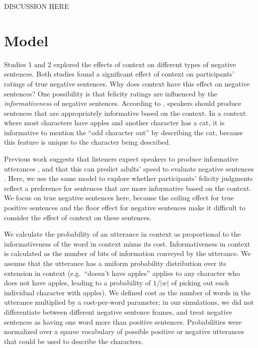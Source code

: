 \documentclass[10pt,letterpaper]{article}
\begin{document}
DISCUSSION HERE


\section{Model}

Studies 1 and 2 explored the effects of context on different types of negative sentences.  Both studies found a significant effect of context on participants' ratings of true negative sentences.  Why does context have this effect on negative sentences?  One possibility is that felicity ratings are influenced by the \emph{informativeness} of negative sentences.  According to , speakers should produce sentences that are appropriately informative based on the context.  In a context where most characters have apples and another character has a cat, it is informative to mention the ``odd character out'' by describing the cat, because this feature is unique to the character being described.

Previous work suggests that listeners expect speakers to produce informative utterances \cite{frank2012}, and that this can predict adults' speed to evaluate negative sentences \cite{nordmeyer2013}.  Here, we use the same model to explore whether participants' felicity judgments reflect a preference for sentences that are more informative based on the context.  We focus on true negative sentences here, because the ceiling effect for true positive sentences and the floor effect for negative sentences make it difficult to consider the effect of context on these sentences.  

We calculate the probability of an utterance in context as proportional to the informativeness of the word in context minus its cost.  Informativeness in context is calculated as the number of bits of information conveyed by the utterance.  We assume that the utterance has a uniform probability distribution over its extension in context (e.g.\ ``doesn't have apples'' applies to any character who does not have apples, leading to a probability of $1/|w|$ of picking out each individual character with apples). We defined cost as the number of words in the utterance multiplied by a cost-per-word parameter; in our simulations, we did not differentiate between different negative sentence frames, and treat negative sentences as having one word more than positive sentences.  Probabilities were normalized over a sparse vocabulary of possible positive or negative utterances that could be used to describe the characters.
\end{document}
